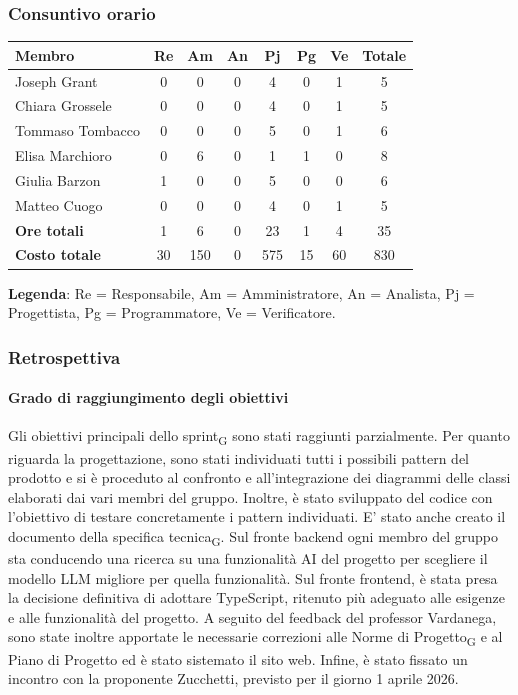\documentclass[11pt,a4paper]{article}
\newcommand{\gls}[1]{#1\textsubscript{G}}
\begin{document}
\subsubsection{Consuntivo orario}
\begin{center}
    \begin{tabular}{|l|c|c|c|c|c|c|c|}
        \hline
        \textbf{Membro} & \textbf{Re} & \textbf{Am} & \textbf{An} & \textbf{Pj} & \textbf{Pg} & \textbf{Ve} & \textbf{Totale} \\
        \hline
        Joseph Grant & 0 & 0 & 0 & 4 & 0 & 1 & 5\\
        \hline
        Chiara Grossele & 0 & 0 & 0 & 4 & 0 & 1 & 5\\
        \hline
        Tommaso Tombacco & 0 & 0 & 0 & 5 & 0 & 1 & 6\\
        \hline
        Elisa Marchioro & 0 & 6 & 0 & 1 & 1 & 0 & 8\\
        \hline
        Giulia Barzon & 1 & 0 & 0 & 5 & 0 & 0 & 6\\
        \hline
        Matteo Cuogo & 0 & 0 & 0 & 4 & 0 & 1 & 5\\
        \hline
        \textbf{Ore totali} & 1 & 6 & 0 & 23 & 1 & 4 & 35\\
        \hline
        \textbf{Costo totale} & 30 & 150 & 0 & 575 & 15 & 60 & 830\\
        \hline
    \end{tabular}
\end{center}

\noindent \textbf{Legenda}: Re = Responsabile, Am = Amministratore, An = Analista, Pj = Progettista, Pg = Programmatore, Ve = Verificatore.

\subsubsection{Retrospettiva}
\paragraph{Grado di raggiungimento degli obiettivi}
Gli obiettivi principali dello \gls{sprint} sono stati raggiunti parzialmente. Per quanto riguarda la progettazione, sono stati individuati tutti i possibili pattern del prodotto e si è proceduto al confronto e all’integrazione dei diagrammi delle classi elaborati dai vari membri del gruppo. Inoltre, è stato sviluppato del codice con l’obiettivo di testare concretamente i pattern individuati. E' stato anche creato il documento della \gls{specifica tecnica}.
Sul fronte backend ogni membro del gruppo sta conducendo una ricerca su una funzionalità AI del progetto per scegliere il modello LLM migliore per quella funzionalità.
Sul fronte frontend, è stata presa la decisione definitiva di adottare TypeScript, ritenuto più adeguato alle esigenze e alle funzionalità del progetto. A seguito del feedback del professor Vardanega, sono state inoltre apportate le necessarie correzioni alle \gls{Norme di Progetto} e al Piano di Progetto ed è stato sistemato il sito web.
Infine, è stato fissato un incontro con la proponente Zucchetti, previsto per il giorno 1 aprile 2026.
\end{document}
